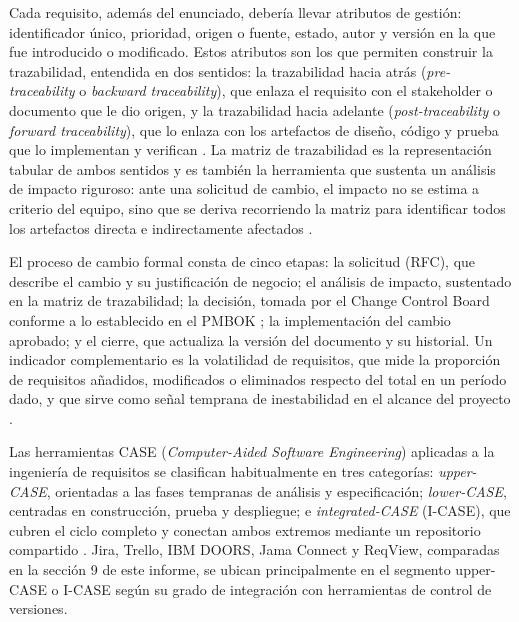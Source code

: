 \documentclass[11pt,a4paper]{article}
\newcommand{\subseccion}[1]{%
  \vspace{0.35cm}
  \noindent{\color{uteqverde}\textbf{\large #1}}\par
  \vspace{0.15cm}
}
\begin{document}
Cada requisito, además del enunciado, debería llevar atributos de gestión:
identificador único, prioridad, origen o fuente, estado, autor y versión en la
que fue introducido o modificado. Estos atributos son los que permiten construir
la trazabilidad, entendida en dos sentidos: la trazabilidad hacia atrás
(\textit{pre-traceability} o \textit{backward traceability}), que enlaza el
requisito con el stakeholder o documento que le dio origen, y la trazabilidad
hacia adelante (\textit{post-traceability} o \textit{forward traceability}), que
lo enlaza con los artefactos de diseño, código y prueba que lo implementan y
verifican \cite{gotel1994}. La matriz de trazabilidad es la representación tabular
de ambos sentidos y es también la herramienta que sustenta un análisis de impacto
riguroso: ante una solicitud de cambio, el impacto no se estima a criterio del
equipo, sino que se deriva recorriendo la matriz para identificar todos los
artefactos directa e indirectamente afectados \cite{clelandhuang2012}.

El proceso de cambio formal consta de cinco etapas: la solicitud (RFC), que
describe el cambio y su justificación de negocio; el análisis de impacto,
sustentado en la matriz de trazabilidad; la decisión, tomada por el Change
Control Board conforme a lo establecido en el PMBOK \cite{pmbok2021}; la
implementación del cambio aprobado; y el cierre, que actualiza la versión del
documento y su historial. Un indicador complementario es la volatilidad de
requisitos, que mide la proporción de requisitos añadidos, modificados o
eliminados respecto del total en un período dado, y que sirve como señal temprana
de inestabilidad en el alcance del proyecto \cite{wiegers2013}.

\subseccion{3.4 Herramientas CASE para IR}

Las herramientas CASE (\textit{Computer-Aided Software Engineering}) aplicadas a
la ingeniería de requisitos se clasifican habitualmente en tres categorías:
\textit{upper-CASE}, orientadas a las fases tempranas de análisis y
especificación; \textit{lower-CASE}, centradas en construcción, prueba y
despliegue; e \textit{integrated-CASE} (I-CASE), que cubren el ciclo completo y
conectan ambos extremos mediante un repositorio compartido \cite{wiegers2013}.
Jira, Trello, IBM DOORS, Jama Connect y ReqView, comparadas en la sección 9 de
este informe, se ubican principalmente en el segmento upper-CASE o I-CASE según
su grado de integración con herramientas de control de versiones.
\end{document}

